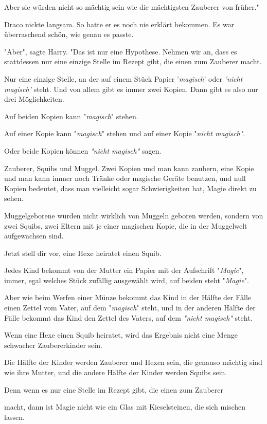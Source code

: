 {Aber sie würden nicht so mächtig sein wie die mächtigsten Zauberer von früher."

Draco nickte langsam. So hatte er es noch nie erklärt bekommen. Es war überraschend schön, wie genau es passte.

"Aber", sagte Harry. "Das ist nur eine Hypothese. Nehmen wir an, dass es stattdessen nur eine einzige Stelle im Rezept gibt, die einen zum Zauberer macht.

Nur eine einzige Stelle, an der auf einem Stück Papier '\emph{magisch}' oder \emph{'nicht magisch'} steht. Und von allem gibt es immer zwei Kopien. Dann gibt es also nur drei Möglichkeiten.

Auf beiden Kopien kann "\emph{magisch}" stehen.

Auf einer Kopie kann "\emph{magisch}" stehen und auf einer Kopie "\emph{nicht magisch"}.

Oder beide Kopien können \emph{"nicht magisch"} sagen.

Zauberer, Squibs und Muggel. Zwei Kopien und man kann zaubern, eine Kopie und man kann immer noch Tränke oder magische Geräte benutzen, und null Kopien bedeutet, dass man vielleicht sogar Schwierigkeiten hat, Magie direkt zu sehen.

Muggelgeborene würden nicht wirklich von Muggeln geboren werden, sondern von zwei Squibs, zwei Eltern mit je einer magischen Kopie, die in der Muggelwelt aufgewachsen sind.

Jetzt stell dir vor, eine Hexe heiratet einen Squib.

Jedes Kind bekommt von der Mutter ein Papier mit der Aufschrift "\emph{Magie}", immer, egal welches Stück zufällig ausgewählt wird, auf beiden steht "\emph{Magie}".

Aber wie beim Werfen einer Münze bekommt das Kind in der Hälfte der Fälle einen Zettel vom Vater, auf dem "\emph{magisch}" steht, und in der anderen Hälfte der Fälle bekommt das Kind den Zettel des Vaters, auf dem \emph{"nicht magisch"} steht.

Wenn eine Hexe einen Squib heiratet, wird das Ergebnis nicht eine Menge schwacher Zaubererkinder sein.

Die Hälfte der Kinder werden Zauberer und Hexen sein, die genauso mächtig sind wie ihre Mutter, und die andere Hälfte der Kinder werden Squibs sein.

Denn wenn es nur eine Stelle im Rezept gibt, die einen zum Zauberer

macht, dann ist Magie nicht wie ein Glas mit Kieselsteinen, die sich mischen lassen.

}
